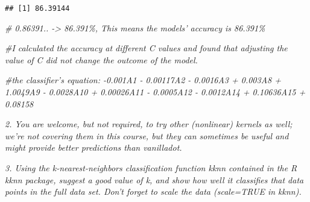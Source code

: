 \documentclass[
]{article}
\newenvironment{Shaded}{\begin{snugshade}}{\end{snugshade}}
\newcommand{\CommentTok}[1]{\textcolor[rgb]{0.56,0.35,0.01}{\textit{#1}}}
\begin{document}
\begin{verbatim}
## [1] 86.39144
\end{verbatim}

\begin{Shaded}
\begin{Highlighting}[]
\CommentTok{\# 0.86391.. {-}\textgreater{} 86.391\%, This means the models’ accuracy is 86.391\% }

\CommentTok{\#I calculated the accuracy at different C values and found that adjusting the value of C did not change the outcome of the model. }

\CommentTok{\#the classifier’s equation: {-}0.001A1 {-} 0.00117A2 {-} 0.0016A3 + 0.003A8 + 1.0049A9 {-} 0.0028A10 + 0.00026A11 {-} 0.0005A12 {-} 0.0012A14 + 0.10636A15 + 0.08158}
\end{Highlighting}
\end{Shaded}

\emph{2. You are welcome, but not required, to try other (nonlinear)
kernels as well; we're not covering them in this course, but they can
sometimes be useful and might provide better predictions than
vanilladot.}

\emph{3. Using the k-nearest-neighbors classification function kknn
contained in the R kknn package, suggest a good value of k, and show how
well it classifies that data points in the full data set. Don't forget
to scale the data (scale=TRUE in kknn).}
\end{document}
